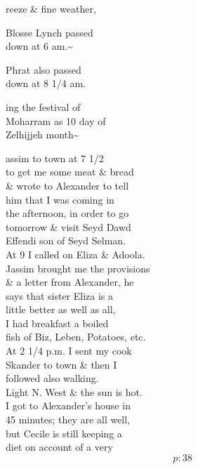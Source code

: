 \documentclass{report}
\begin{document}



	\par{
 	reeze \& fine weather,\ \\
	}

	\par{
 	Blosse Lynch passed\ \\down at 6 am.\~{}\ \\
	}


	\par{
 	Phrat also passed\ \\down at 8 1/4 am.\ \\
	}

	\par{
 	ing the festival of\ \\Moharram as 10 day of\ \\Zelhijjeh month\~{}\ \\
	}

	\par{
 	assim to town at 7 1/2\ \\to get me some meat \& bread\ \\\& wrote to Alexander to tell\ \\him that I was coming in\ \\the afternoon, in order to go\ \\tomorrow \& visit Seyd Dawd\ \\Effendi son of Seyd Selman.\ \\At 9 I called on Eliza \& Adoola.\ \\Jassim brought me the provisions\ \\\& a letter from Alexander, he\ \\says that sister Eliza is a\ \\little better as well as all,\ \\I had breakfast a boiled\ \\fish of Biz, Leben, Potatoes, etc.\ \\At 2 1/4 p.m. I sent my cook\ \\Skander to town \& then I\ \\followed also walking.\ \\Light N. West \& the sun is hot.\ \\I got to Alexander's house in\ \\45 minutes; they are all well,\ \\but Cecile is still keeping a\ \\diet on account of a very\ \\
  \[p: 38 \]

	}
\end{document}
